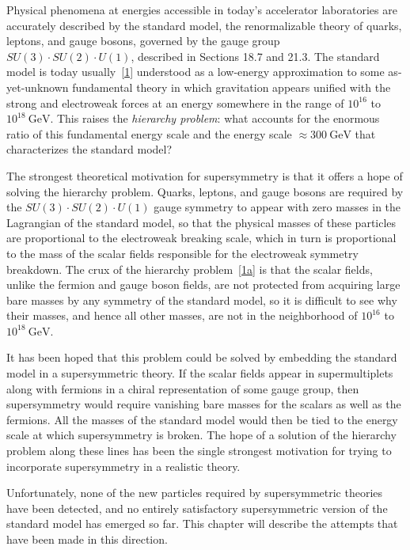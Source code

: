 
Physical phenomena at energies accessible in today's accelerator
laboratories are accurately described by the standard model, the
renormalizable theory of quarks, leptons, and gauge bosons, governed by
the gauge group \(SU(3)\mathbin{\cdot}SU(2)\mathbin{\cdot}U(1)\),
described in Sections 18.7 and 21.3. The standard model is today
usually~\hyperref[ch28-ref-1]{[1]} understood as a low-energy
approximation to some as-yet-unknown fundamental theory in which
gravitation appears unified with the strong and electroweak forces at an
energy somewhere in the range of \(10^{16}\) to \(10^{18}\ \mathrm{GeV}\).
This raises the \textit{hierarchy problem}: what accounts for the enormous
ratio of this fundamental energy scale and the energy scale
\(\approx 300\ \mathrm{GeV}\) that characterizes the standard model?

The strongest theoretical motivation for supersymmetry is that it offers
a hope of solving the hierarchy problem. Quarks, leptons, and gauge
bosons are required by the
\(SU(3)\mathbin{\cdot}SU(2)\mathbin{\cdot}U(1)\) gauge symmetry to appear
with zero masses in the Lagrangian of the standard model, so that the
physical masses of these particles are proportional to the electroweak
breaking scale, which in turn is proportional to the mass of the scalar
fields responsible for the electroweak symmetry breakdown. The crux of
the hierarchy problem~\hyperref[ch28-ref-1a]{[1a]} is that the scalar
fields, unlike the fermion and gauge boson fields, are not protected from
acquiring large bare masses by any symmetry of the standard model, so it
is difficult to see why their masses, and hence all other masses, are not
in the neighborhood of \(10^{16}\) to \(10^{18}\ \mathrm{GeV}\).

It has been hoped that this problem could be solved by embedding the
standard model in a supersymmetric theory. If the scalar fields appear in
supermultiplets along with fermions in a chiral representation of some
gauge group, then supersymmetry would require vanishing bare masses for
the scalars as well as the fermions. All the masses of the standard model
would then be tied to the energy scale at which supersymmetry is broken.
The hope of a solution of the hierarchy problem along these lines has
been the single strongest motivation for trying to incorporate
supersymmetry in a realistic theory.

Unfortunately, none of the new particles required by supersymmetric
theories have been detected, and no entirely satisfactory supersymmetric
version of the standard model has emerged so far. This chapter will
describe the attempts that have been made in this direction.
